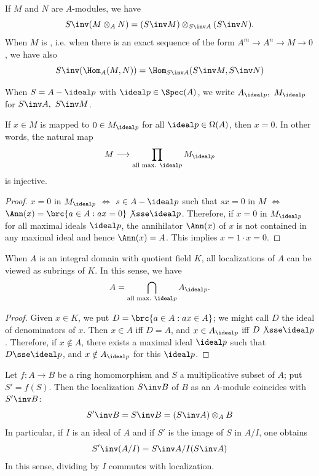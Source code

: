 \documentclass[../main]{subfiles}
\begin{document}
If $M$ and $N$ are $A$-modules, we have
\[S\inv(M \otimes_A N) = (S\inv M) \otimes_{S\inv A} (S\inv N).\]
When $M$ is , i.e. when there is an exact sequence of the form $A^m\longrightarrow A^n\longrightarrow M\longrightarrow 0$, we have also
\[S\inv(\Hom_A(M,N)) = \Hom_{S\inv A}(S\inv M,S\inv N)\]

\newparagraph
When $S=A-\ideal p$ with $\ideal p\in\Spec(A)$, we write $A_{\ideal p},~M_{\ideal p}$ for $S\inv A,~S\inv M$.

\begin{lemma}\label{lem:01.01}
If $x\in M$ is mapped to $0\in M_{\ideal p}$ for all $\ideal p\in\Omega(A)$, then $x=0$. In other words, the natural map
\[M \longrightarrow \prod_{\text{all max. }\ideal p}M_{\ideal p}\]
is injective.
\end{lemma}

\begin{proof}
$x=0$ in $M_{\ideal p}$ $\iff$ $s\in A-\ideal p$ such that $sx=0$ in $M$ $\iff$ $\Ann(x) = \brc{a\in A:ax=0}\not\sse \ideal p$. Therefore, if $x=0$ in $M_{\ideal p}$ for all maximal ideals $\ideal p$, the annihilator $\Ann(x)$ of $x$ is not contained in any maximal ideal and hence $\Ann(x)=A$. This implies $x=1\cdot x=0$.
\end{proof}

\begin{lemma}\label{lem:01.02}
When $A$ is an integral domain with quotient field $K$, all localizations of $A$ can be viewed as subrings of $K$. In this sense, we have
\[A = \bigcap_{\text{all max. }\ideal p}A_{\ideal p}.\]
\end{lemma}

\begin{proof}
Given $x\in K$, we put $D=\brc{a\in A:ax\in A}$; we might call $D$ the ideal of denominators of $x$. Then $x\in A$ iff $D=A$, and $x\in A_{\ideal p}$ iff $D\not\sse\ideal p$. Therefore, if $x\notin A$, there exists a maximal ideal $\ideal p$ such that $D\sse\ideal p$, and $x\notin A_{\ideal p}$ for this $\ideal p$.
\end{proof}

\newparagraph
Let $f:A\longrightarrow B$ be a ring homomorphism and $S$ a multiplicative subset of $A$; put $S'=f(S)$. Then the localization $S\inv B$ of $B$ as an $A$-module coincides with ${S'}\inv B$:
\begin{equation}\label{eqn:1.I.1}
{S'}\inv B = S\inv B = (S\inv A) \otimes_A B
\end{equation}
In particular, if $I$ is an ideal of $A$ and if $S'$ is the image of $S$ in $A/I$, one obtains
\begin{equation}\label{eqn:1.I.2}
{S'}\inv(A/I) = S\inv A/I(S\inv A)
\end{equation}
In this sense, dividing by $I$ commutes with localization.
\end{document}
